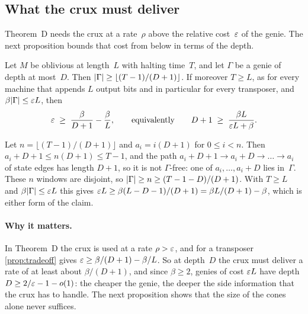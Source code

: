 \subsection{What the crux must deliver}\label{sec:dec-rates}

Theorem~D needs the crux at a rate~$\rho$ above the relative cost~$\varepsilon$ of the genie. The next proposition bounds that
cost from below in terms of the depth.

\begin{proposition}\label{prop:tradeoff}
\notformalized
Let $M$ be oblivious at length~$L$ with halting time~$T$, and let $\Gamma$ be a genie of depth at most~$D$. Then
$\lvert \Gamma \rvert\ge\lfloor(T-1)/(D+1)\rfloor$. If moreover $T\ge L$, as for every machine that appends $L$ output bits
and in particular for every transposer, and $\beta\lvert \Gamma \rvert\le\varepsilon L$, then
\[
  \varepsilon\;\ge\;\frac{\beta}{D+1}-\frac{\beta}{L},\qquad\text{equivalently}\qquad D+1\;\ge\;\frac{\beta L}{\varepsilon L+\beta}.
\]
\end{proposition}

\begin{informalproof}
Let $n=\lfloor(T-1)/(D+1)\rfloor$ and $a_i=i(D+1)$ for $0\le i<n$. Then $a_i+D+1\le n(D+1)\le T-1$, and the path
$a_i+D+1\to a_i+D\to\dots\to a_i$ of state edges has length $D+1$, so it is not $\Gamma$-free: one of
$a_i,\dots,a_i+D$ lies in~$\Gamma$. These $n$ windows are disjoint, so $\lvert \Gamma \rvert\ge n\ge(T-1-D)/(D+1)$. With
$T\ge L$ and $\beta\lvert \Gamma \rvert\le\varepsilon L$ this gives $\varepsilon L\ge\beta(L-D-1)/(D+1)=\beta L/(D+1)-\beta$, which is
either form of the claim.
\end{informalproof}

\paragraph{Why it matters.} In Theorem~D the crux is used at a rate $\rho>\varepsilon$, and for a transposer
\cref{prop:tradeoff} gives $\varepsilon\ge\beta/(D+1)-\beta/L$. So at depth~$D$ the crux must deliver a rate of at least
about $\beta/(D+1)$, and since $\beta\ge2$, genies of cost $\varepsilon L$ have depth $D\ge2/\varepsilon-1-o(1)$: the cheaper the
genie, the deeper the side information that the crux has to handle. The next proposition shows that the size of the
cones alone never suffices.

